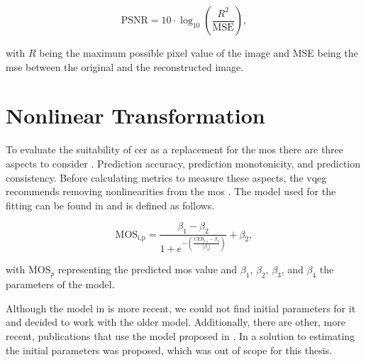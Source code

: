 \begin{equation}
    \text{PSNR} = 10 \cdot \log_{10} \left( \frac{R^2}{\text{MSE}} \right),
    \label{eq:psnr}
\end{equation}

with \(R\) being the maximum possible pixel value of the image and MSE being the \gls{mse} between the original and the reconstructed image.


\section{Nonlinear Transformation}
\label{sec:nonlinear}

To evaluate the suitability of \gls{cer} as a replacement for the \gls{mos} there are three aspects to consider \cite{nonlin_fit_original_2003}\cite{iqa_survey_2020}.
Prediction accuracy, prediction monotonicity, and prediction consistency.
Before calculating metrics to measure these aspects, the \gls{vqeg} recommends removing nonlinearities from the \gls{mos} \cite{nonlin_fit_original_2003}.
The model used for the fitting can be found in \cite{nonlin_fit_model_init_2000}\cite{nonlin_fit_appl_2017} and is defined as follows.

\begin{equation}
    \text{MOS}_{\text{i,p}} = \frac{\beta_{1}-\beta_{2}}{1 + e^{-\left(\frac{\text{CER}_{\text{c,i}}-\beta_{3}}{|\beta_{4}|}\right)}} + \beta_{2},
    \label{eq:nonlinear}
\end{equation}


with $\text{MOS}_{p}$ representing the predicted \gls{mos} value and $\beta_{1}$, $\beta_{2}$, $\beta_{3}$, and $\beta_{4}$ the parameters of the model.

Although the model in \cite{nonlin_fit_original_2003} is more recent, we could not find initial parameters for it and decided to work with the older model.
Additionally, there are other, more recent, publications \cite{ni_esim_2017, nonlin_fit_appl_2017, nonlin_fit_appl_2018, nonlin_fit_appl_2014, nonlin_fit_appl_2011, nonlin_fit_appl_2015, doc_quality_survey_2023, iqa_database_2023, nonlin_fit_appl_2016} that use the model proposed in \cite{nonlin_fit_new_model_2006}.
In \cite{nonlin_fit_init_proof_2017} a solution to estimating the initial parameters was proposed, which was out of scope for this thesis.

